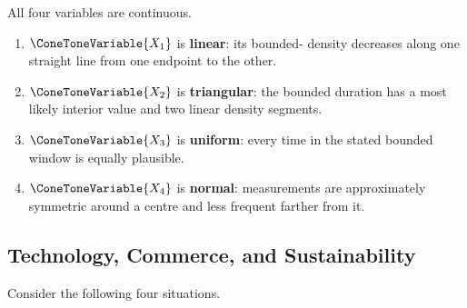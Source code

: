 	All four variables are continuous.
	\begin{enumerate}
		\item $\ConeToneVariable{X_1}$ is \textbf{linear}: its bounded- density decreases along one straight line from one endpoint to the other.
		\item $\ConeToneVariable{X_2}$ is \textbf{triangular}: the bounded duration has a most likely interior value and two linear density segments.
		\item $\ConeToneVariable{X_3}$ is \textbf{uniform}: every time in the stated bounded window is equally plausible.
		\item $\ConeToneVariable{X_4}$ is \textbf{normal}: measurements are approximately symmetric around a centre and less frequent farther from it.
	\end{enumerate}


	\subsection{Technology, Commerce, and Sustainability}
	\label{sec:technology-commerce-sustainability}

	Consider the following four situations.

